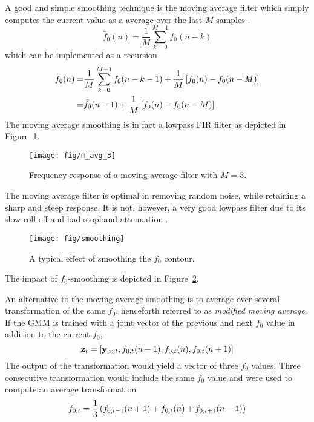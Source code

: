 A good and simple smoothing technique is the moving average filter which simply computes the current value as a average over the last $M$ samples \cite{digsig}.
\begin{equation}
		\bar{f}_0(n) = \frac{1}{M}\sum_{k=0}^{M-1}f_0(n-k)
\end{equation}
which can be implemented as a recursion
\begin{equation}
	\begin{split}
		\bar{f}_0(n) = & \frac{1}{M} \sum_{k=0}^{M-1}f_0(n-k-1) + \frac{1}{M} \left[f_0(n)-f_0(n-M)\right] \\
		= & \bar{f}_0(n-1) + \frac{1}{M} \left[f_0(n)-f_0(n-M)\right] \\
	\end{split}
\end{equation}
The moving average smoothing is in fact a lowpass FIR filter as depicted in Figure~\ref{fig:moving_avg}.
\begin{figure}[htbp]
	\begin{center}
		\texttt{[image: fig/m\_avg\_3]}
		\caption{Frequency response of a moving average filter with $M=3$.}
		\label{fig:moving_avg}
	\end{center}
\end{figure}
The moving average filter is optimal in removing random noise, while retaining a sharp and steep response. It is not, however, a very good lowpass filter due to its slow roll-off and bad stopband attenuation \cite{digsig}.
\begin{figure}[htbp]
	\begin{center}
		\texttt{[image: fig/smoothing]}
		\caption{A typical effect of smoothing the $f_0$ contour.}
		\label{fig:f0_smoothing}
	\end{center}
\end{figure}
The impact of $f_0$-smoothing is depicted in Figure~\ref{fig:f0_smoothing}.

An alternative to the moving average smoothing is to average over several transformation of the same $f_0$, henceforth referred to as \emph{modified moving average}. If the GMM is trained with a joint vector of the previous and next $f_0$ value in addition to the current $f_0$,
\begin{equation}
	\mathbf{z}_t = \left[\mathbf{y}_{cc,t}, f_{0,t}(n-1), f_{0,t}(n), f_{0,t}(n+1)\right] 
\end{equation}
The output of the transformation would yield a vector of three $f_0$ values. Three consecutive transformation would include the same $f_0$ value and were used to compute an average transformation
\begin{equation}
	\bar{f}_{0,t} = \frac{1}{3}\left(f_{0,t-1}(n+1)+f_{0,t}(n)+f_{0,t+1}(n-1)\right) 
\end{equation}

